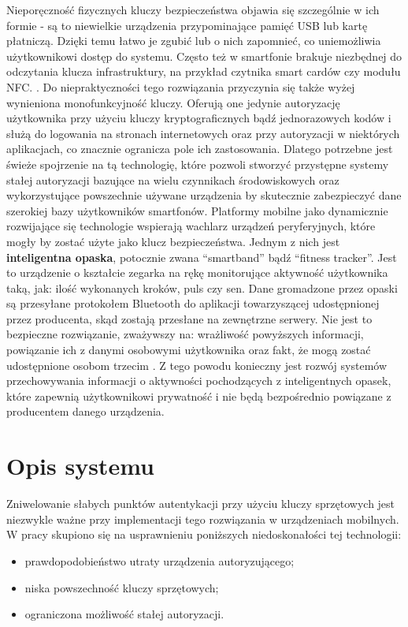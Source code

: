 \indent Nieporęczność fizycznych kluczy bezpieczeństwa objawia się szczególnie w ich formie - są to niewielkie urządzenia przypominające pamięć USB
lub kartę płatniczą. Dzięki temu łatwo je zgubić lub o nich zapomnieć, co uniemożliwia użytkownikowi dostęp do systemu. Często też w smartfonie
brakuje niezbędnej do odczytania klucza infrastruktury, na przykład czytnika smart cardów czy modułu NFC. \cite{Usability-Two-Factor}.
Do niepraktyczności tego rozwiązania przyczynia się także wyżej wynieniona monofunkcyjność kluczy. Oferują one jedynie autoryzację użytkownika przy
użyciu kluczy kryptograficznych bądź jednorazowych kodów i służą do logowania na stronach internetowych oraz przy autoryzacji w niektórych aplikacjach,
co znacznie ogranicza pole ich zastosowania. Dlatego potrzebne jest świeże spojrzenie na tą technologię, które pozwoli stworzyć
przystępne systemy stałej autoryzacji bazujące na wielu czynnikach środowiskowych oraz wykorzystujące powszechnie używane urządzenia
by skutecznie zabezpieczyć dane szerokiej bazy użytkowników smartfonów.
\newline\newline
\indent Platformy mobilne jako dynamicznie rozwijające się technologie wspierają wachlarz urządzeń peryferyjnych, które mogły by zostać użyte jako klucz
bezpieczeństwa. Jednym z nich jest \textbf{inteligentna opaska}, potocznie zwana ``smartband'' bądź ``fitness tracker''. Jest to urządzenie o
kształcie zegarka na rękę monitorujące aktywność użytkownika taką, jak: ilość wykonanych kroków, puls czy sen. Dane gromadzone przez opaski są
przesyłane protokołem Bluetooth do aplikacji towarzyszącej udostępnionej przez producenta, skąd zostają przesłane na zewnętrzne serwery. Nie
jest to bezpieczne rozwiązanie, zważywszy na: wrażliwość powyższych informacji, powiązanie ich z danymi osobowymi użytkownika oraz fakt,
że mogą zostać udostępnione osobom trzecim \cite{Fitness-Tracker-Security}. Z tego powodu konieczny jest rozwój systemów przechowywania informacji o aktywności pochodzących z
inteligentnych opasek, które zapewnią użytkownikowi prywatność i nie będą bezpośrednio powiązane z producentem danego urządzenia.

\section{Opis systemu}
Zniwelowanie słabych punktów autentykacji przy użyciu kluczy sprzętowych jest niezwykle ważne przy implementacji tego rozwiązania w urządzeniach
mobilnych. W pracy skupiono się na usprawnieniu poniższych niedoskonałości tej technologii:
\begin{itemize}
    \item prawdopodobieństwo utraty urządzenia autoryzującego;
    \item niska powszechność kluczy sprzętowych;
    \item ograniczona możliwość stałej autoryzacji.
\end{itemize}

